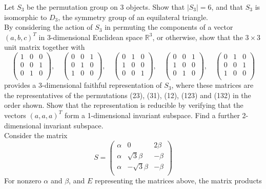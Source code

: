 \documentclass[a4paper]{article}
\begin{document}
\begin{qns}
Let $S_3$ be the permutation group on 3 objects. Show that $|S_3|=6$, and that $S_3$ is isomorphic to $D_3$, the symmetry group of an equilateral triangle.\\[5pt]
By considering the action of $S_3$ in permuting the components of a vector $(a, b, c)^T$ in 3-dimensional Euclidean space $\mathbb{R}^3$, or otherwise, show that the $3\times 3$ unit matrix together with
$$\begin{pmatrix}1&0&0\\0&0&1\\0&1&0\\\end{pmatrix},\quad\begin{pmatrix}0&0&1\\0&1&0\\1&0&0\\\end{pmatrix},\quad\begin{pmatrix}0&1&0\\1&0&0\\0&0&1\\\end{pmatrix},\quad\begin{pmatrix}0&0&1\\1&0&0\\0&1&0\\\end{pmatrix},\quad\begin{pmatrix}0&1&0\\0&0&1\\1&0&0\\\end{pmatrix}$$
provides a 3-dimensional faithful representation of $S_3$, where these matrices are the representatives of the permutations (23), (31), (12), (123) and (132) in the order shown. Show that the representation is reducible by verifying that the vectors $(a, a, a)^T$ form a 1-dimensional invariant subspace. Find a further 2-dimensional invariant subspace.\\[5pt]
Consider the matrix
$$S=\begin{pmatrix}\alpha&0&2\beta\\\alpha&\sqrt{3}\beta&-\beta\\\alpha&-\sqrt{3}\beta&-\beta\\\end{pmatrix}$$
For nonzero $\alpha$ and $\beta$, and $E$ representing the matrices above, the matrix products

\end{qns}
\end{document}
